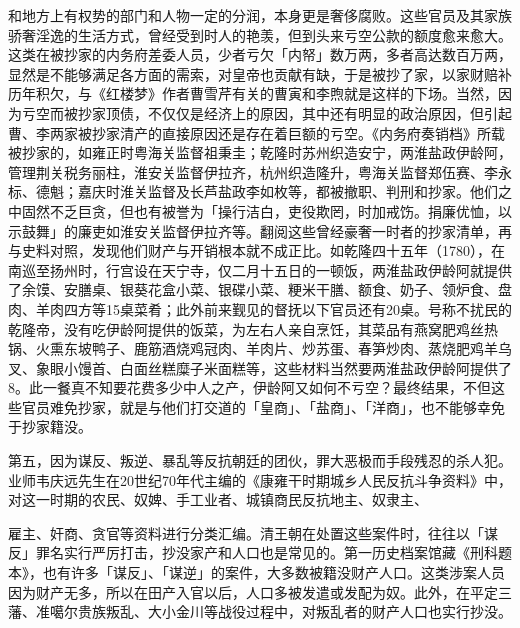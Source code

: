 \noindent 和地方上有权势的部门和人物一定的分润，本身更是奢侈腐败。这些官员及其家族骄奢淫逸的生活方式，曾经受到时人的艳羡，但到头来亏空公款的额度愈来愈大。这类在被抄家的内务府差委人员，少者亏欠「内帑」数万两，多者高达数百万两，显然是不能够满足各方面的需索，对皇帝也贡献有缺，于是被抄了家，以家财赔补历年积欠，与《红楼梦》作者曹雪芹有关的曹寅和李煦就是这样的下场。当然，因为亏空而被抄家顶债，不仅仅是经济上的原因，其中还有明显的政治原因，但引起曹、李两家被抄家清产的直接原因还是存在着巨额的亏空。《内务府奏销档》所载被抄家的，如雍正时粤海关监督祖秉圭；乾隆时苏州织造安宁，两淮盐政伊龄阿，管理荆关税务丽柱，淮安关监督伊拉齐，杭州织造隆升，粤海关监督郑伍赛、李永标、德魁；嘉庆时淮关监督及长芦盐政李如枚等，都被撤职、判刑和抄家。他们之中固然不乏巨贪，但也有被誉为「操行洁白，吏役欺罔，时加戒饬。捐廉优恤，以示鼓舞」的廉吏如淮安关监督伊拉齐等。翻阅这些曾经豪奢一时者的抄家清单，再与史料对照，发现他们财产与开销根本就不成正比。如乾隆四十五年（1780），在南巡至扬州时，行宫设在天宁寺，仅二月十五日的一顿饭，两淮盐政伊龄阿就提供了余馍、安膳桌、银葵花盒小菜、银碟小菜、粳米干膳、额食、奶子、领炉食、盘肉、羊肉四方等15桌菜肴；此外前来觐见的督抚以下官员还有20桌。号称不扰民的乾隆帝，没有吃伊龄阿提供的饭菜，为左右人亲自烹饪，其菜品有燕窝肥鸡丝热锅、火熏东坡鸭子、鹿筋酒烧鸡冠肉、羊肉片、炒苏蛋、春笋炒肉、蒸烧肥鸡羊乌叉、象眼小馒首、白面丝糕糜子米面糕等，这些材料当然要两淮盐政伊龄阿提供了8。此一餐真不知要花费多少中人之产，伊龄阿又如何不亏空？最终结果，不但这些官员难免抄家，就是与他们打交道的「皇商」、「盐商」、「洋商」，也不能够幸免于抄家籍没。

第五，因为谋反、叛逆、暴乱等反抗朝廷的团伙，罪大恶极而手段残忍的杀人犯。业师韦庆远先生在20世纪70年代主编的《康雍干时期城乡人民反抗斗争资料》中，对这一时期的农民、奴婢、手工业者、城镇商民反抗地主、奴隶主、

\vfill
\begin{BookNotes}
\end{BookNotes}

\noindent 雇主、奸商、贪官等资料进行分类汇编。清王朝在处置这些案件时，往往以「谋反」罪名实行严厉打击，抄没家产和人口也是常见的。第一历史档案馆藏《刑科题本》，也有许多「谋反」、「谋逆」的案件，大多数被籍没财产人口。这类涉案人员因为财产无多，所以在田产入官以后，人口多被发遣或发配为奴。此外，在平定三藩、准噶尔贵族叛乱、大小金川等战役过程中，对叛乱者的财产人口也实行抄没。

